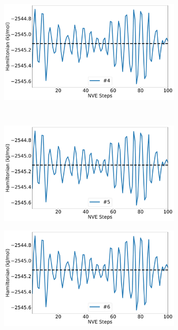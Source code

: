 \begin{figure}[htbp]
\begin{subfigure}{0.48\textwidth}
\end{subfigure}
\begin{subfigure}{0.48\textwidth}
\includegraphics[width=\linewidth]{figs/drift4.pdf}
\end{subfigure}
\\
\begin{subfigure}{0.48\textwidth}
\includegraphics[width=\linewidth]{figs/drift5.pdf}
\end{subfigure}
\begin{subfigure}{0.48\textwidth}
\includegraphics[width=\linewidth]{figs/drift6.pdf}

\end{subfigure}
\end{figure}
